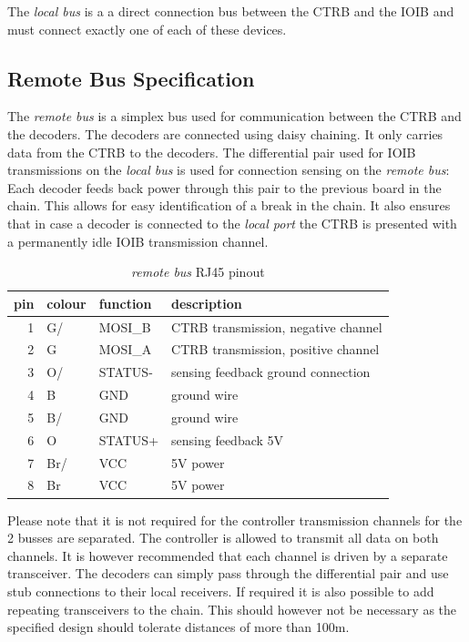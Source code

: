 \documentclass{scrreprt}
\begin{document}
The \emph{local bus} is a a direct connection bus between the CTRB and the IOIB and must connect exactly one of each of these devices.

\subsection{Remote Bus Specification}
The \emph{remote bus} is a simplex bus used for communication between the CTRB and the decoders. The decoders are connected using daisy chaining. It only carries data from the CTRB to the decoders. The differential pair used for IOIB transmissions on the \emph{local bus} is used for connection sensing on the \emph{remote bus}: Each decoder feeds back power through this pair to the previous board in the chain. This allows for easy identification of a break in the chain. It also ensures that in case a decoder is connected to the \emph{local port} the CTRB is presented with a permanently idle IOIB transmission channel.

\begin{table}[ht!]
\centering
\begin{tabular}{ |r|l|l|l| }
\hline
pin & colour & function & description \\\hline\hline
  1 & G/     & MOSI\_B  & CTRB transmission, negative channel \\\hline
  2 & G      & MOSI\_A  & CTRB transmission, positive channel \\\hline
  3 & O/     & STATUS-  & sensing feedback ground connection \\\hline
  4 & B      & GND      & ground wire \\\hline
  5 & B/     & GND      & ground wire \\\hline
  6 & O      & STATUS+  & sensing feedback 5V \\\hline
  7 & Br/    & VCC      & 5V power \\\hline
  8 & Br     & VCC      & 5V power \\\hline
\end{tabular}
\caption{\emph{remote bus} RJ45 pinout}
\end{table}

Please note that it is not required for the controller transmission channels for the 2 busses are separated. The controller is allowed to transmit all data on both channels. It is however recommended that each channel is driven by a separate transceiver. The decoders can simply pass through the differential pair and use stub connections to their local receivers. If required it is also possible to add repeating transceivers to the chain. This should however not be necessary as the specified design should tolerate distances of more than 100m.
\end{document}
